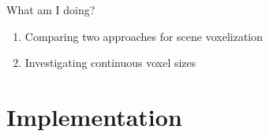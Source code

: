 \documentclass[10pt]{beamer}
\begin{document}



\begin{frame}{What am I doing?} %
  \begin{enumerate}
    \item Comparing two approaches for scene voxelization %
    \item Investigating continuous voxel sizes %
  \end{enumerate}
\end{frame}

\section{Implementation}
\end{document}

